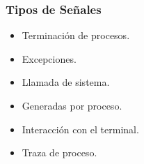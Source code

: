 \subsubsection{Tipos de Señales}
\begin{itemize}
    \item Terminación de procesos.
    \item Excepciones.
    \item Llamada de sistema.
    \item Generadas por proceso.
    \item Interacción con el terminal.
    \item Traza de proceso.
\end{itemize}

